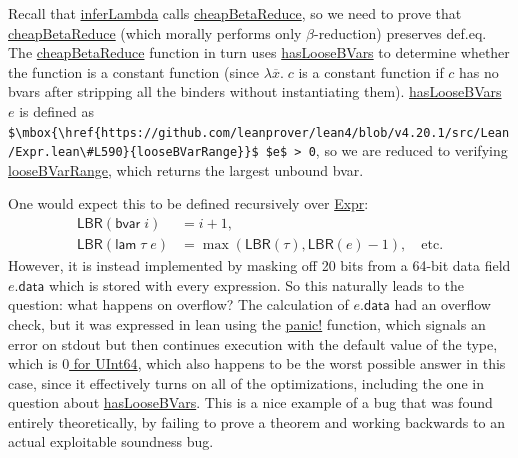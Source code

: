 \documentclass[sigplan,10pt,screen]{acmart}\settopmatter{printfolios=true,printccs=false,printacmref=false}
\newcommand{\code}[1]{\mbox{\ttfamily\small #1}}
\begin{document}
Recall that \href{https://github.com/digama0/lean4lean/blob/cpp2026/Lean4Lean/TypeChecker.lean#L115}{\code{inferLambda}} calls \href{https://github.com/digama0/lean4lean/blob/cpp2026/Lean4Lean/Instantiate.lean#L8}{\code{cheapBetaReduce}}, so we need to prove that \href{https://github.com/digama0/lean4lean/blob/cpp2026/Lean4Lean/Instantiate.lean#L8}{\code{cheapBetaReduce}} (which morally performs only $\beta$-reduction) preserves def.eq. The \href{https://github.com/digama0/lean4lean/blob/cpp2026/Lean4Lean/Instantiate.lean#L8}{\code{cheapBetaReduce}} function in turn uses \href{https://github.com/leanprover/lean4/blob/v4.20.1/src/Lean/Expr.lean#L1267}{\code{hasLooseBVars}} to determine whether the function is a constant function (since $\lambda \overline{x}.\;c$ is a constant function if $c$ has no bvars after stripping all the binders without instantiating them). \href{https://github.com/leanprover/lean4/blob/v4.20.1/src/Lean/Expr.lean#L1267}{\code{hasLooseBVars}} $e$ is defined as \lstinline|$\mbox{\href{https://github.com/leanprover/lean4/blob/v4.20.1/src/Lean/Expr.lean\#L590}{looseBVarRange}}$ $e$ > 0|, so we are reduced to verifying \href{https://github.com/leanprover/lean4/blob/v4.20.1/src/Lean/Expr.lean#L590}{\code{looseBVarRange}}, which returns the largest unbound bvar.

One would expect this to be defined recursively over \href{https://github.com/leanprover/lean4/blob/v4.20.1/src/Lean/Expr.lean#L301}{\code{Expr}}:
\begin{align*}
\mathsf{LBR}(\mathsf{bvar}\;i)&=i+1,\\
\mathsf{LBR}(\mathsf{lam}\;\tau\;e)&=\max(\mathsf{LBR}(\tau),\mathsf{LBR}(e)-1), \quad \mbox{etc.}
\end{align*}
However, it is instead implemented by masking off 20 bits from a 64-bit data field \href{https://github.com/leanprover/lean4/blob/v4.20.1/src/Lean/Expr.lean#L470}{$e.\mathsf{data}$} which is stored with every expression. So this naturally leads to the question: what happens on overflow? The calculation of \href{https://github.com/leanprover/lean4/blob/v4.20.1/src/Lean/Expr.lean#L470}{$e.\mathsf{data}$} had an overflow check, but it was expressed in lean using the \href{https://github.com/leanprover/lean4/blob/v4.20.1/src/Init/Prelude.lean#L2860}{\code{panic!}} function, which signals an error on \textsf{stdout} but then continues execution with the default value of the type, which is \href{https://github.com/leanprover/lean4/blob/v4.20.1/src/Init/Prelude.lean#L2354}{$0$ for \code{UInt64}}, which also happens to be the worst possible answer in this case, since it effectively turns on all of the optimizations, including the one in question about \href{https://github.com/leanprover/lean4/blob/v4.20.1/src/Lean/Expr.lean#L1267}{\code{hasLooseBVars}}. This is a nice example of a bug that was found entirely theoretically, by failing to prove a theorem and working backwards to an actual exploitable soundness bug.
\end{document}
